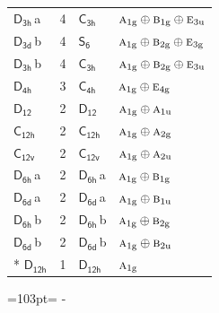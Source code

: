 \documentclass[10pt,a4paper]{article}
\newcommand{\needspace}[1]{\par\penalty-100\begingroup\dimen0=#1\relax\dimen2=\pagegoal
  \advance\dimen2-\pagetotal\ifdim\dimen0>\dimen2\relax\ifdim\dimen2>0pt\vfil\break\fi\fi
  \endgroup}
\numberwithin{equation}{section}
\newcommand{\grp}[1]{\mathsf{#1}}
\newcommand{\irr}[1]{\text{\normalfont\scshape #1}}
\newcommand{\ptag}[1]{\mathrm{#1}}
\newcommand{\clsletter}[1]{\,{\scriptsize\color{black!55}#1}}
\newlength{\fillwidth}\newlength{\cellwidth}\newlength{\colwidth}
\begin{document}
{\begin{longtable}{@{}lrl>{\RaggedRight\arraybackslash}p{\fillwidth}@{}}
\href{D3h.pdf}{$\grp{D_{3h}}$}\clsletter{a} & 4 & \href{C3h.pdf}{$\grp{C_{3h}}$} & $\irr{a}_{1\ptag{g}}\oplus \irr{b}_{1\ptag{g}}\oplus \irr{e}_{3\ptag{u}}$\\
\href{D3d.pdf}{$\grp{D_{3d}}$}\clsletter{b} & 4 & \href{S6.pdf}{$\grp{S_{6}}$} & $\irr{a}_{1\ptag{g}}\oplus \irr{b}_{2\ptag{g}}\oplus \irr{e}_{3\ptag{g}}$\\
\href{D3h.pdf}{$\grp{D_{3h}}$}\clsletter{b} & 4 & \href{C3h.pdf}{$\grp{C_{3h}}$} & $\irr{a}_{1\ptag{g}}\oplus \irr{b}_{2\ptag{g}}\oplus \irr{e}_{3\ptag{u}}$\\
\href{D4h.pdf}{$\grp{D_{4h}}$} & 3 & \href{C4h.pdf}{$\grp{C_{4h}}$} & $\irr{a}_{1\ptag{g}}\oplus \irr{e}_{4\ptag{g}}$\\
\href{D12.pdf}{$\grp{D_{12}}$} & 2 & \href{D12.pdf}{$\grp{D_{12}}$} & $\irr{a}_{1\ptag{g}}\oplus \irr{a}_{1\ptag{u}}$\\
\href{C12h.pdf}{$\grp{C_{12h}}$} & 2 & \href{C12h.pdf}{$\grp{C_{12h}}$} & $\irr{a}_{1\ptag{g}}\oplus \irr{a}_{2\ptag{g}}$\\
\href{C12v.pdf}{$\grp{C_{12v}}$} & 2 & \href{C12v.pdf}{$\grp{C_{12v}}$} & $\irr{a}_{1\ptag{g}}\oplus \irr{a}_{2\ptag{u}}$\\
\href{D6h.pdf}{$\grp{D_{6h}}$}\clsletter{a} & 2 & \href{D6h.pdf}{$\grp{D_{6h}}$}\clsletter{a} & $\irr{a}_{1\ptag{g}}\oplus \irr{b}_{1\ptag{g}}$\\
\href{D6d.pdf}{$\grp{D_{6d}}$}\clsletter{a} & 2 & \href{D6d.pdf}{$\grp{D_{6d}}$}\clsletter{a} & $\irr{a}_{1\ptag{g}}\oplus \irr{b}_{1\ptag{u}}$\\
\href{D6h.pdf}{$\grp{D_{6h}}$}\clsletter{b} & 2 & \href{D6h.pdf}{$\grp{D_{6h}}$}\clsletter{b} & $\irr{a}_{1\ptag{g}}\oplus \irr{b}_{2\ptag{g}}$\\
\href{D6d.pdf}{$\grp{D_{6d}}$}\clsletter{b} & 2 & \href{D6d.pdf}{$\grp{D_{6d}}$}\clsletter{b} & $\irr{a}_{1\ptag{g}}\oplus \irr{b}_{2\ptag{u}}$\\*
\href{D12h.pdf}{$\grp{D_{12h}}$} & 1 & \href{D12h.pdf}{$\grp{D_{12h}}$} & $\irr{a}_{1\ptag{g}}$\\
\bottomrule\end{longtable}}
\needspace{103pt}
\end{document}
